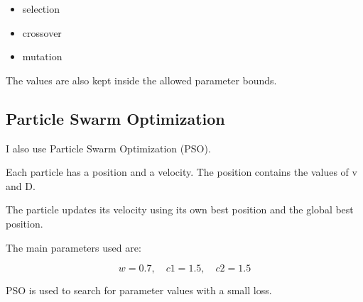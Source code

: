 \begin{itemize}
    \item selection
    \item crossover
    \item mutation
\end{itemize}

The values are also kept inside the allowed parameter bounds.

\subsection{Particle Swarm Optimization}

I also use Particle Swarm Optimization (PSO).

Each particle has a position and a velocity. The position contains the values of v and D.

The particle updates its velocity using its own best position and the global best position.

The main parameters used are:

\[
w = 0.7,\quad c1 = 1.5,\quad c2 = 1.5
\]

PSO is used to search for parameter values with a small loss.